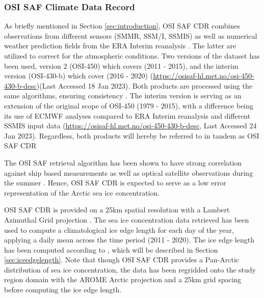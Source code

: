 \documentclass[../main/thesis.tex]{subfiles}
\begin{document}
\subsubsection{OSI SAF Climate Data Record}
\label{sec:osisafcdr}
As briefly mentioned in Section \ref{sec:introduction}, OSI SAF CDR combines observations from different sensors (SMMR, SSM/I, SSMIS) as well as numerical weather prediction fields from the ERA Interim reanalysis \citep{Dee2011}. The latter are utilized to correct for the atmospheric conditions. Two versions of the dataset has been used, version 2 (OSI-450) which covers (2011 - 2015), and the interim version (OSI-430-b) which cover (2016 - 2020) (\url{https://osisaf-hl.met.no/osi-450-430-b-desc})(Last Accessed 18 Jan 2023). Both products are processed using the same algorithms, ensuring consistency \citep{Lavergne2019a}. The interim version is serving as an extension of the original scope of OSI-450 (1979 - 2015), with a difference being its use of ECMWF analyses compared to ERA Interim reanalysis and different SSMIS input data (\url{https://osisaf-hl.met.no/osi-450-430-b-desc}, Last Accessed 24 Jan 2023). Regardless, both products will hereby be referred to in tandem as OSI SAF CDR

The OSI SAF retrieval algorithm has been shown to have strong correlation against ship based measurements \citep{Kern2019} as well as optical satellite observations during the summer \citep{Kern2020}. Hence, OSI SAF CDR is expected to serve as a low error representation of the Arctic sea ice concentration.

OSI SAF CDR is provided on a 25km spatial resolution with a Lambert Azimuthal Grid projection \citep{Soerensen2021}. The sea ice concentration data retrieved has been used to compute a climatological ice edge length for each day of the year, applying a daily mean across the time period (2011 - 2020). The ice edge length has been computed according to \citet{Melsom2019}, which will be described in Section \ref{sec:iceedgelength}. Note that though OSI SAF CDR provides a Pan-Arctic distribution of sea ice concentration, the data has been regridded onto the study region domain with the AROME Arctic projection and a 25km grid spacing before computing the ice edge length.
\end{document}
